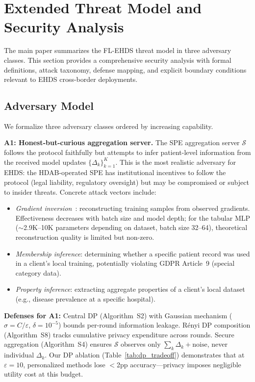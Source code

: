 \documentclass[conference,a4paper]{IEEEtran}
\begin{document}
\section{Extended Threat Model and Security Analysis}
\label{sec:extended_threat}

The main paper summarizes the FL-EHDS threat model in three adversary classes. This section provides a comprehensive security analysis with formal definitions, attack taxonomy, defense mapping, and explicit boundary conditions relevant to EHDS cross-border deployments.

\subsection{Adversary Model}

We formalize three adversary classes ordered by increasing capability.

\textbf{A1: Honest-but-curious aggregation server.} The SPE aggregation server $\mathcal{S}$ follows the protocol faithfully but attempts to infer patient-level information from the received model updates $\{\Delta_k\}_{k=1}^{K}$. This is the most realistic adversary for EHDS: the HDAB-operated SPE has institutional incentives to follow the protocol (legal liability, regulatory oversight) but may be compromised or subject to insider threats. Concrete attack vectors include:
\begin{itemize}
    \item \textit{Gradient inversion}~\cite{zhu2019deep}: reconstructing training samples from observed gradients. Effectiveness decreases with batch size and model depth; for the tabular MLP ($\sim$2.9K--10K parameters depending on dataset, batch size 32--64), theoretical reconstruction quality is limited but non-zero.
    \item \textit{Membership inference}: determining whether a specific patient record was used in a client's local training, potentially violating GDPR Article~9 (special category data).
    \item \textit{Property inference}: extracting aggregate properties of a client's local dataset (e.g., disease prevalence at a specific hospital).
\end{itemize}

\textbf{Defenses for A1:} Central DP (Algorithm~S2) with Gaussian mechanism ($\sigma = C/\varepsilon$, $\delta = 10^{-5}$) bounds per-round information leakage. R\'enyi DP composition (Algorithm~S8) tracks cumulative privacy expenditure across rounds. Secure aggregation (Algorithm~S4) ensures $\mathcal{S}$ observes only $\sum_k \Delta_k + \text{noise}$, never individual $\Delta_k$. Our DP ablation (Table~\ref{tab:dp_tradeoff}) demonstrates that at $\varepsilon = 10$, personalized methods lose $<$2pp accuracy---privacy imposes negligible utility cost at this budget.
\end{document}
